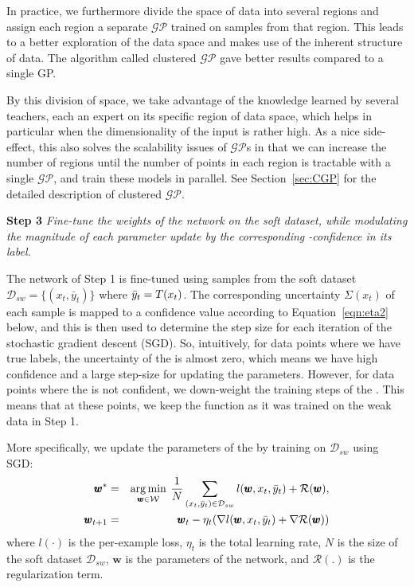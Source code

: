 In practice, we furthermore divide the space of data into several regions and assign each region a separate $\mathcal{GP}$ trained on samples from that region. This leads to a better exploration of the data space and makes use of the inherent structure of data. The algorithm called clustered $\mathcal{GP}$ gave better results compared to a single GP. 

By this division of space, we take advantage of the knowledge learned by several teachers, each an expert on its specific region of data space, which helps in particular when the dimensionality of the input is rather high. As a nice side-effect, this also solves the scalability issues of $\mathcal{GP}$s in that we can increase the number of regions until the number of points in each region is tractable with a single $\mathcal{GP}$, and train these models in parallel. See Section~\ref{sec:CGP} for the detailed description of clustered $\mathcal{GP}$.

%
\textbf{Step 3} \emph{Fine-tune the weights of the \std network on the soft dataset, while modulating the magnitude of each parameter update by the corresponding \tch-confidence in its label.}

The \std network of Step 1 is fine-tuned using samples from the soft dataset $\mathcal{D}_{sw}=\{(x_t, \bar{y}_t)\}$ where $\bar{y}_t=T(x_t)$.
The corresponding uncertainty $\Sigma(x_t)$ of each sample is mapped to a confidence value according to Equation~\ref{eqn:eta2} below, and this is then used to determine the step size for each iteration of the stochastic gradient descent (SGD). So, intuitively, for data points where we have true labels, the uncertainty of the \tch is almost zero, which means we have high confidence and a large step-size for updating the parameters. However, for data points where the \tch is not confident, we down-weight the training steps of the \std. This means that at these points, we keep the \std function as it was trained on the weak data in Step 1.

More specifically, we update the parameters of the \std by training on $\mathcal{D}_{sw}$ using SGD:
\begin{eqnarray*}
  \pmb{w}^* &=& \operatorname*{arg\,min}_{\pmb{w} \in \mathcal{W}} \> \frac{1}{N}\sum_{(x_t,\bar{y}_t) \in \mathcal{D}_{sw}}l(\pmb{w}, x_t, \bar{y}_t) + \mathcal{R}(\pmb{w}), \\
  \pmb{w}_{t+1} &=& \pmb{w}_t - \eta_t(\nabla l(\pmb{w},x_t,\bar{y}_t) + \nabla \mathcal{R}(\pmb{w}))
\end{eqnarray*}
where $l(\cdot)$ is the per-example loss, $\eta_t$ is the total learning rate, $N$ is the size of the soft dataset $\mathcal{D}_{sw}$, $\pmb{w}$ is the parameters of the \std network, and $\mathcal{R(.)}$ is the regularization term. %

